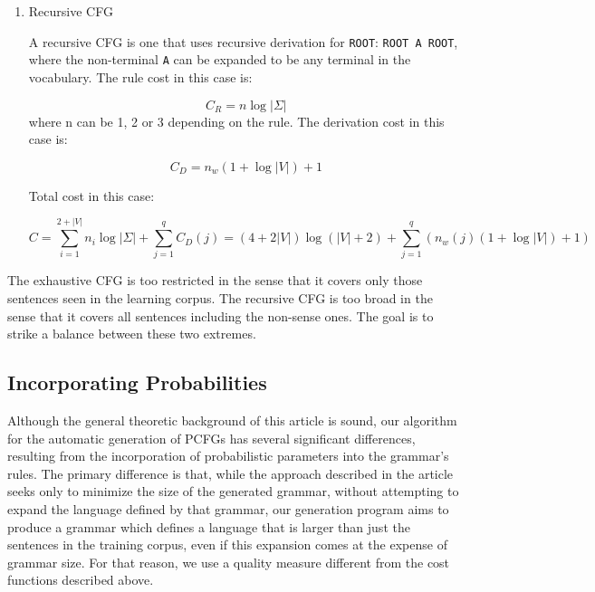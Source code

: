 \documentclass[paper=a4, fontsize=11pt]{scrartcl} %
\numberwithin{equation}{section} %
\numberwithin{figure}{section} %
\numberwithin{table}{section} %
\begin{document}
\begin{enumerate}[1.]
\item Recursive CFG

A recursive CFG is one that uses recursive derivation for \texttt{ROOT}: \texttt{ROOT \textrightarrow A ROOT}, where the non-terminal \texttt{A} can be expanded to be any terminal in the vocabulary.
The rule cost in this case is:

\begin{equation}\label{first}
C_R = n \log \lvert \Sigma \rvert
\end{equation}
where n can be 1, 2 or 3 depending on the rule.
The derivation cost in this case is:

\begin{equation}\label{first}
C_D = n_w(1 + \log \lvert V \rvert) + 1
\end{equation}

Total cost in this case:

\begin{equation}\label{first}
C = \sum \limits_{i=1}^{2+\lvert V \rvert}n_i \log \lvert \Sigma \rvert + \sum \limits_{j=1}^q C_D(j) = (4 + 2\lvert V \rvert) \log(\lvert V \rvert + 2) + \sum \limits_{j=1}^q (n_w(j)(1 + \log \lvert V \rvert) + 1)
\end{equation}

\end{enumerate}

The exhaustive CFG is too restricted in the sense that it covers only those sentences seen in the learning corpus. The recursive CFG is too broad in the sense that it covers all sentences including the non-sense ones. The goal is to strike a balance between these two extremes.

\subsection{Incorporating Probabilities}
Although the general theoretic background of this article is sound, our algorithm for the automatic generation of PCFGs has several significant differences, resulting from the incorporation of probabilistic parameters into the grammar's rules. The primary difference is that, while the approach described in the article seeks only to minimize the size of the generated grammar, without attempting to expand the language defined by that grammar, our generation program aims to produce a grammar which defines a language that is larger than just the sentences in the training corpus, even if this expansion comes at the expense of grammar size. For that reason, we use a quality measure different from the cost functions described above.
\end{document}
